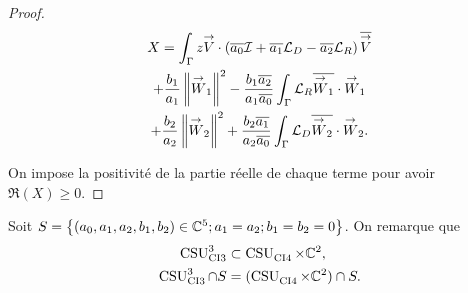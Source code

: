 \begin{proof}
    \begin{multline*}
      X = \int_\Gamma z \vV \cdot \left(\conj{a_0}\oI  + \conj{a_1} \LD - \conj{a_2}\LR\right)\conj{\vV}
      \\
      + \frac{b_1}{a_1} \norm{\vW_1}^2 - \frac{b_1\conj{a_2}}{a_1\conj{a_0}}\int_\Gamma \LR\conj{\vW_1}\cdot\vW_1
      \\
      + \frac{b_2}{a_2} \norm{\vW_2}^2 + \frac{b_2\conj{a_1}}{a_2\conj{a_0}}\int_\Gamma \LD\conj{\vW_2}\cdot\vW_2.
    \end{multline*}

    On impose la positivité de la partie réelle de chaque terme pour avoir \(\Re(X)\ge 0\).
  \end{proof}

  Soit \(S = \left\lbrace (a_0,a_1,a_2,b_1,b_2) \in \CC^5 ; a_1 = a_2 ; b_1 = b_2 = 0 \right\rbrace \). On remarque que
  \begin{align}
    \CSU[3]{CI3} & \subset \CSU{CI4}\times\CC^2,
    \\ 
    \CSU[3]{CI3}\cap S & = (\CSU{CI4}\times\CC^2)\cap S. 
  \end{align}

